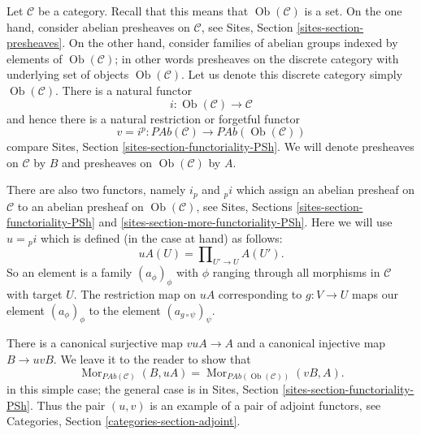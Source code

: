 \documentclass{stacks-project}
\theoremstyle{plain}
\theoremstyle{definition}
\theoremstyle{remark}
\numberwithin{equation}{subsection}
\def\Mor{\mathop{\mathrm{Mor}}\nolimits}
\def\Ob{\mathop{\mathrm{Ob}}\nolimits}
\begin{document}
\noindent
Let $\mathcal{C}$ be a category. Recall that this means that
$\Ob(\mathcal{C})$ is a set. On the one hand, consider abelian
presheaves on $\mathcal{C}$, see
Sites, Section \ref{sites-section-presheaves}.
On the other hand, consider families of abelian groups
indexed by elements of $\Ob(\mathcal{C})$; in other
words presheaves on the discrete category with underlying set
of objects $\Ob(\mathcal{C})$. Let us denote this
discrete category simply $\Ob(\mathcal{C})$.
There is a natural functor
$$
i : \Ob(\mathcal{C}) \longrightarrow \mathcal{C}
$$
and hence there is a natural restriction or forgetful functor
$$
v = i^p :
\textit{PAb}(\mathcal{C})
\longrightarrow
\textit{PAb}(\Ob(\mathcal{C}))
$$
compare Sites, Section \ref{sites-section-functoriality-PSh}.
We will denote presheaves
on $\mathcal{C}$ by $B$ and presheaves on
$\Ob(\mathcal{C})$ by $A$.

\medskip\noindent
There are also two functors, namely $i_p$ and ${}_pi$
which assign an abelian presheaf on $\mathcal{C}$
to an abelian presheaf on $\Ob(\mathcal{C})$, see
Sites, Sections \ref{sites-section-functoriality-PSh} and
\ref{sites-section-more-functoriality-PSh}.
Here we will use $u = {}_pi$ which is defined (in the case at hand)
as follows:
$$
uA(U) = \prod\nolimits_{U' \to U} A(U').
$$
So an element is a family $(a_\phi)_\phi$ with $\phi$
ranging through all morphisms in $\mathcal{C}$ with target $U$.
The restriction map on $uA$ corresponding to $g : V \to U$
maps our element $(a_\phi)_\phi$ to the element
$(a_{g \circ \psi})_\psi$.

\medskip\noindent
There is a canonical surjective map $vuA \to A$ and a canonical
injective map $B \to uvB$. We leave it to the reader to show that
$$
\Mor_{\textit{PAb}(\mathcal{C})}(B, uA)
=
\Mor_{\textit{PAb}(\Ob(\mathcal{C}))}(vB, A).
$$
in this simple case; the general case is in
Sites, Section \ref{sites-section-functoriality-PSh}.
Thus the pair $(u, v)$ is an example of a pair of adjoint
functors, see
Categories, Section \ref{categories-section-adjoint}.
\end{document}
